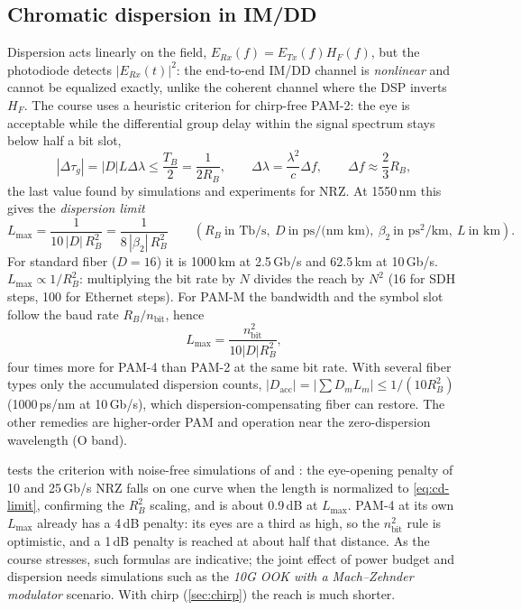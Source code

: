 \subsection{Chromatic dispersion in IM/DD}\label{sec:imdd-cd}
Dispersion acts linearly on the field, $E_{Rx}(f)=E_{Tx}(f)H_F(f)$, but the photodiode detects
$|E_{Rx}(t)|^2$: the end-to-end IM/DD channel is \emph{nonlinear} and cannot be equalized exactly, unlike
the coherent channel where the DSP inverts $H_F$. The course uses a heuristic criterion for
chirp-free PAM-2: the eye is acceptable while the differential group delay within the signal
spectrum stays below half a bit slot,
\begin{equation}
  |\Delta\tau_g|=|D|L\Delta\lambda\le\frac{T_B}{2}=\frac{1}{2R_B},\qquad \Delta\lambda=\frac{\lambda^2}{c}\Delta f,\qquad
  \Delta f\approx\frac23R_B,
\end{equation}
the last value found by simulations and experiments for NRZ. At 1550\,nm this gives the
\emph{dispersion limit}
\begin{equation}
  L_{\max}=\frac{1}{10\,|D|\,R_B^2}=\frac{1}{8\,|\beta_2|\,R_B^2}
  \qquad(R_B\ \text{in Tb/s},\ D\ \text{in ps/(nm km)},\ \beta_2\ \text{in ps}^2/\text{km},\ L\ \text{in km}).
  \label{eq:cd-limit}
\end{equation}
For standard fiber ($D=16$) it is 1000\,km at 2.5\,Gb/s and 62.5\,km at 10\,Gb/s. $L_{\max}\propto1/R_B^2$:
multiplying the bit rate by $N$ divides the reach by $N^2$ (16 for SDH steps, 100 for Ethernet
steps). For PAM-M the bandwidth and the symbol slot follow the baud rate $R_B/n_{\mathrm{bit}}$, hence
\begin{equation}
  L_{\max}=\frac{n_{\mathrm{bit}}^2}{10|D|R_B^2},
\end{equation}
four times more for PAM-4 than PAM-2 at the same bit rate. With several fiber types only the
accumulated dispersion counts, $|D_{\mathrm{acc}}|=|\sum D_mL_m|\le1/(10R_B^2)$ (1000\,ps/nm at 10\,Gb/s), which
dispersion-compensating fiber can restore. The other remedies are higher-order PAM and operation
near the zero-dispersion wavelength (O band).

 tests the criterion with noise-free simulations of 
and : the eye-opening penalty of 10 and 25\,Gb/s NRZ falls on one curve when the
length is normalized to \cref{eq:cd-limit}, confirming the $R_B^2$ scaling, and is about 0.9\,dB at
$L_{\max}$. PAM-4 at its own $L_{\max}$ already has a 4\,dB penalty: its eyes are a third as high, so the
$n_{\mathrm{bit}}^2$ rule is optimistic, and a 1\,dB penalty is reached at about half that distance. As the
course stresses, such formulas are indicative; the joint effect of power budget and dispersion
needs simulations such as the \emph{10G OOK with a Mach--Zehnder modulator} scenario. With chirp
(\cref{sec:chirp}) the reach is much shorter.

